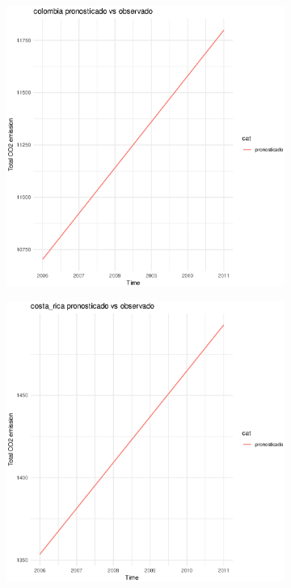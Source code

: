 \documentclass[twocolumn]{article}
\begin{document}
\begin{figure}
        \begin{subfigure}{.3\textwidth}
            \includegraphics[width=\linewidth]{images/colombia_imputation.eps}
        \end{subfigure}
        \hspace*{\fill}
        \begin{subfigure}{.3\textwidth}
            \includegraphics[width=\linewidth]{images/costa_rica_imputation.eps}

\end{subfigure}
\end{figure}
\end{document}
